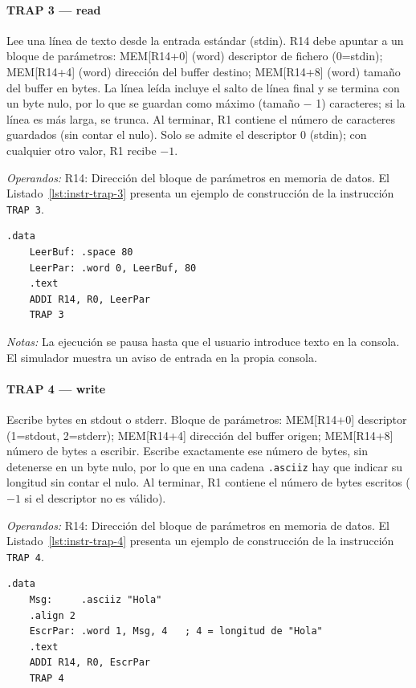 \documentclass[../main.tex]{subfiles}
\begin{document}
\paragraph*{TRAP 3 --- read}
Lee una línea de texto desde la entrada estándar (stdin). R14 debe apuntar a un bloque de parámetros: MEM[R14+0] (word) descriptor de fichero (0=stdin); MEM[R14+4] (word) dirección del buffer destino; MEM[R14+8] (word) tamaño del buffer en bytes. La línea leída incluye el salto de línea final y se termina con un byte nulo, por lo que se guardan como máximo (tamaño $-$ 1) caracteres; si la línea es más larga, se trunca. Al terminar, R1 contiene el número de caracteres guardados (sin contar el nulo). Solo se admite el descriptor 0 (stdin); con cualquier otro valor, R1 recibe $-1$.

\textit{Operandos:} R14: Dirección del bloque de parámetros en memoria de datos.
El Listado~\ref{lst:instr-trap-3} presenta un ejemplo de construcción de la instrucción \texttt{TRAP 3}.

\begin{lstlisting}[caption={TRAP 3},label={lst:instr-trap-3}]
	.data
	LeerBuf: .space 80
	LeerPar: .word 0, LeerBuf, 80
	.text
	ADDI R14, R0, LeerPar
	TRAP 3
\end{lstlisting}
\textit{Notas:} La ejecución se pausa hasta que el usuario introduce texto en la consola. El simulador muestra un aviso de entrada en la propia consola.

\paragraph*{TRAP 4 --- write}
Escribe bytes en stdout o stderr. Bloque de parámetros: MEM[R14+0] descriptor (1=stdout, 2=stderr); MEM[R14+4] dirección del buffer origen; MEM[R14+8] número de bytes a escribir. Escribe exactamente ese número de bytes, sin detenerse en un byte nulo, por lo que en una cadena \texttt{.asciiz} hay que indicar su longitud sin contar el nulo. Al terminar, R1 contiene el número de bytes escritos ($-1$ si el descriptor no es válido).

\textit{Operandos:} R14: Dirección del bloque de parámetros en memoria de datos.
El Listado~\ref{lst:instr-trap-4} presenta un ejemplo de construcción de la instrucción \texttt{TRAP 4}.

\begin{lstlisting}[caption={TRAP 4},label={lst:instr-trap-4}]
	.data
	Msg:     .asciiz "Hola"
	.align 2
	EscrPar: .word 1, Msg, 4   ; 4 = longitud de "Hola"
	.text
	ADDI R14, R0, EscrPar
	TRAP 4
\end{lstlisting}
\end{document}
